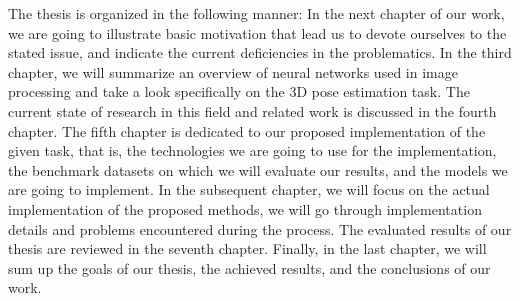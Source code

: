 \vspace{5mm}
\noindent The thesis is organized in the following manner: In the next chapter of our work, we are going to illustrate basic motivation that lead us to devote ourselves to the stated issue, and indicate the current deficiencies in the problematics. In the third chapter, we will summarize an overview of neural networks used in image processing and take a look specifically on the 3D pose estimation task. The current state of research in this field and related work is discussed in the fourth chapter. The fifth chapter is dedicated to our proposed implementation of the given task, that is, the technologies we are going to use for the implementation, the benchmark datasets on which we will evaluate our results, and the models we are going to implement. In the subsequent chapter, we will focus on the actual implementation of the proposed methods, we will go through implementation details and problems encountered during the process. The evaluated results of our thesis are reviewed in the seventh chapter. Finally, in the last chapter, we will sum up the goals of our thesis, the achieved results, and the conclusions of our work.
